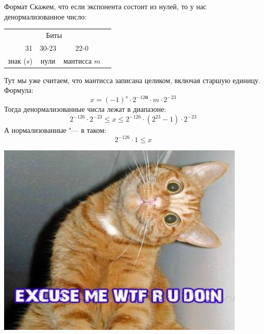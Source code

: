 \begin{frame}{Формат}
	Скажем, что если экспонента состоит из нулей, то у нас денормализованное число:
	\begin{center}
		\begin{tabular}{|r|c|c|c|}
			\multicolumn{3}{c}{Биты} \\
			31 & 30-23 & 22-0 \\\hline
			знак ($s$) & нули & мантисса $m$ \\
		\end{tabular}
	\end{center}
	Тут мы уже считаем, что мантисса записана целиком, включая старшую единицу.
	Формула:
	\[
		x = (-1)^s \cdot 2^{-12\textbf{6}} \cdot m \cdot 2^{-23}
	\]
	Тогда денормализованные числа лежат в диапазоне:
	\[
		2^{-126} \cdot 2^{-23} \le x \le 2^{-126} \cdot (2^{23}-1) \cdot2^{-23}
	\]
	А нормализованные "--- в таком:
	\[
		2^{-126} \cdot 1 \le x
	\]
\end{frame}

\begin{frame}
	\begin{center}
		\includegraphics[scale=0.75]{what-are-you-doing.jpg}
	\end{center}
\end{frame}

